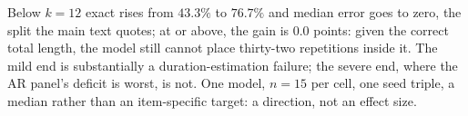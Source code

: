 Below $k=12$ exact rises from $43.3\%$ to $76.7\%$ and median error
goes to zero, the split the main text quotes; at or above, the gain is
$0.0$ points: given the correct total length, the model still cannot
place thirty-two repetitions inside it. The mild end is substantially
a duration-estimation failure; the severe end, where the AR panel's
deficit is worst, is not. One model, $n=15$ per cell, one seed triple,
a median rather than an item-specific target: a direction, not an
effect size.

